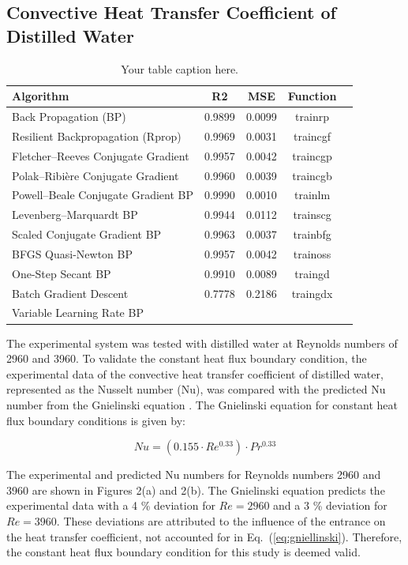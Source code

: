 \documentclass{article}
\begin{document}
\subsection{Convective Heat Transfer Coefficient of Distilled Water}


\begin{table}[h]
	\centering
	\begin{tabular}{lcccc}
		\toprule
		Algorithm & R2 & MSE & Function \\
		\midrule
		Back Propagation (BP) & 0.9899 & 0.0099 & trainrp \\
		Resilient Backpropagation (Rprop) & 0.9969 & 0.0031 & traincgf \\
		Fletcher–Reeves Conjugate Gradient & 0.9957 & 0.0042 & traincgp \\
		Polak–Ribière Conjugate Gradient & 0.9960 & 0.0039 & traincgb \\
		Powell–Beale Conjugate Gradient BP & 0.9990 & 0.0010 & trainlm \\
		Levenberg–Marquardt BP & 0.9944 & 0.0112 & trainscg \\
		Scaled Conjugate Gradient BP & 0.9963 & 0.0037 & trainbfg \\
		BFGS Quasi-Newton BP & 0.9957 & 0.0042 & trainoss \\
		One-Step Secant BP & 0.9910 & 0.0089 & traingd \\
		Batch Gradient Descent & 0.7778 & 0.2186 & traingdx \\
		Variable Learning Rate BP & & & \\
		\bottomrule
	\end{tabular}
	\caption{Your table caption here.}
	\label{tab:yourtablelabel}
\end{table}

The experimental system was tested with distilled water at Reynolds numbers of 2960 and 3960. To validate the constant heat flux boundary condition, the experimental data of the convective heat transfer coefficient of distilled water, represented as the Nusselt number (Nu), was compared with the predicted Nu number from the Gnielinski equation \cite{ref9}. The Gnielinski equation for constant heat flux boundary conditions is given by:

\begin{equation}
Nu = \left(0.155 \cdot Re^{0.33}\right) \cdot Pr^{0.33}
\label{eq:gniellinski}
\end{equation}

The experimental and predicted Nu numbers for Reynolds numbers 2960 and 3960 are shown in Figures 2(a) and 2(b). The Gnielinski equation predicts the experimental data with a 4 \% deviation for $Re = 2960$ and a 3 \% deviation for $Re = 3960$. These deviations are attributed to the influence of the entrance on the heat transfer coefficient, not accounted for in Eq.~(\ref{eq:gniellinski}). Therefore, the constant heat flux boundary condition for this study is deemed valid.
\end{document}
